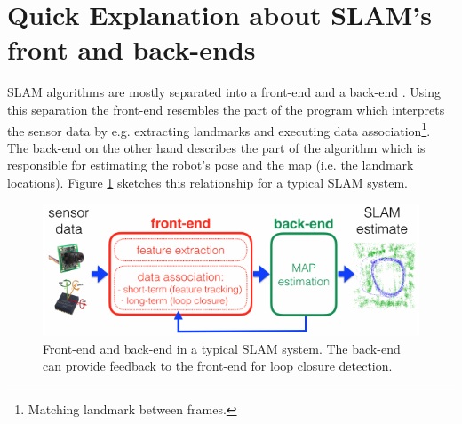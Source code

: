 \documentclass[a4paper,12pt]{scrartcl}
\begin{document}
\section{Quick Explanation about SLAM's front and back-ends}
SLAM algorithms are mostly separated into a front-end and a back-end \cite{Cadena2016}. Using this separation
the front-end resembles the part of the program which interprets the sensor data by e.g. extracting landmarks and executing
data association\footnote{Matching landmark between frames.}. The back-end on the other hand describes the part of the
algorithm which is responsible for estimating the robot's pose and the map (i.e. the landmark locations). Figure
\ref{fig:slam_front_and_back_end} sketches this relationship for a typical SLAM system.

\begin{figure}[htbp]
    \begin{center}
        \includegraphics[width=\textwidth]{slam_front_and_back_end.pdf}
    \end{center}
    \caption{Front-end and back-end in a typical SLAM system. The back-end can provide feedback to the front-end for loop
    closure detection. \cite{Cadena2016}}
    \label{fig:slam_front_and_back_end}
\end{figure}
\end{document}
